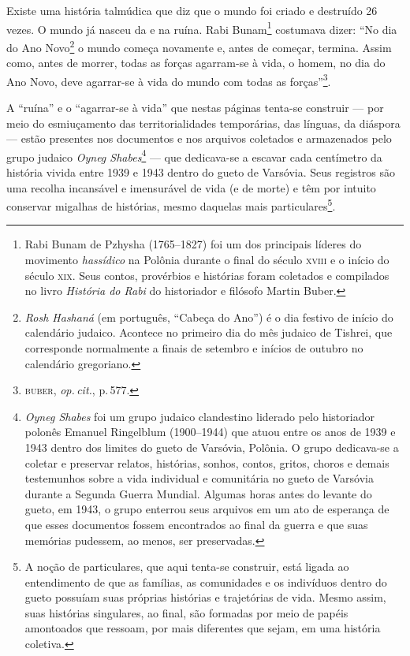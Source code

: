 \noindent{}Existe uma história talmúdica que diz que o mundo foi criado e
destruído 26 vezes. O mundo já nasceu da e na ruína. Rabi
Bunam\footnote{Rabi Bunam de Pzhysha (1765--1827) foi um dos principais
  líderes do movimento \emph{hassídico} na Polônia durante o final do
  século \textsc{xviii} e o início do século \textsc{xix}. Seus contos, provérbios e
  histórias foram coletados e compilados no livro \emph{História do
  Rabi} do historiador e filósofo Martin Buber.} costumava dizer:
``No dia do Ano Novo\footnote{\emph{Rosh Hashaná} (em português,
  ``Cabeça do Ano'') é o dia festivo de início do calendário judaico.
  Acontece no primeiro dia do mês judaico de Tishrei, que corresponde
  normalmente a finais de setembro e inícios de outubro no calendário
  gregoriano.} o mundo começa novamente e, antes de começar,
termina. Assim como, antes de morrer, todas as forças agarram-se à vida,
o homem, no dia do Ano Novo, deve agarrar-se à vida do mundo com todas
as forças''\footnote{\textsc{buber}, \emph{op.\,cit.}, p.\,577.}.

A ``ruína'' e o ``agarrar-se à vida'' que nestas páginas
tenta-se construir --- por meio do esmiuçamento das territorialidades
temporárias, das línguas, da diáspora --- estão presentes nos documentos
e nos arquivos coletados e armazenados pelo grupo judaico \emph{Oyneg
Shabes}\footnote{\emph{Oyneg Shabes} foi um grupo judaico clandestino
  liderado pelo historiador polonês Emanuel Ringelblum (1900--1944) que
  atuou entre os anos de 1939 e 1943 dentro dos limites do gueto de
  Varsóvia, Polônia. O grupo dedicava-se a coletar e preservar relatos,
  histórias, sonhos, contos, gritos, choros e demais testemunhos sobre a
  vida individual e comunitária no gueto de Varsóvia durante a Segunda
  Guerra Mundial. Algumas horas antes do levante do gueto, em 1943, o
  grupo enterrou seus arquivos em um ato de esperança de que esses
  documentos fossem encontrados ao final da guerra e que suas memórias
  pudessem, ao menos, ser preservadas.} --- que dedicava-se a escavar
cada centímetro da história vivida entre 1939 e 1943 dentro do gueto de
Varsóvia. Seus registros são uma recolha incansável e imensurável de
vida (e de morte) e têm por intuito conservar migalhas de histórias,
mesmo daquelas mais particulares\footnote{A noção de particulares, que
  aqui tenta-se construir, está ligada ao entendimento de que as
  famílias, as comunidades e os indivíduos dentro do gueto possuíam suas
  próprias histórias e trajetórias de vida. Mesmo assim, suas histórias
  singulares, ao final, são formadas por meio de papéis amontoados que
  ressoam, por mais diferentes que sejam, em uma história coletiva.}.

